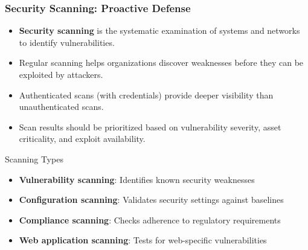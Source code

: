\documentclass{beamer}
\begin{document}
\begin{frame}
\frametitle{Security Scanning: Proactive Defense}
\begin{itemize}
\item \textbf{Security scanning} is the systematic examination of systems and networks to identify vulnerabilities.
\item Regular scanning helps organizations discover weaknesses before they can be exploited by attackers.
\item Authenticated scans (with credentials) provide deeper visibility than unauthenticated scans.
\item Scan results should be prioritized based on vulnerability severity, asset criticality, and exploit availability.
\end{itemize}

\begin{block}{Scanning Types}
\begin{itemize}
\item \textbf{Vulnerability scanning}: Identifies known security weaknesses
\item \textbf{Configuration scanning}: Validates security settings against baselines
\item \textbf{Compliance scanning}: Checks adherence to regulatory requirements
\item \textbf{Web application scanning}: Tests for web-specific vulnerabilities
\end{itemize}
\end{block}
\end{frame}
\end{document}
